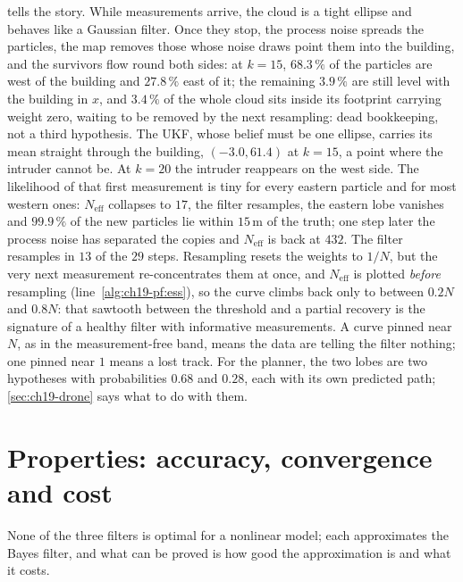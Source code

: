  tells the story.
While measurements arrive, the cloud is a tight ellipse and behaves like a
Gaussian filter. Once they stop, the process noise spreads the particles,
the map removes those whose noise draws point them into the building, and
the survivors flow round both sides: at $k = 15$, $68.3\,\%$ of the
particles are west of the building and $27.8\,\%$ east of it; the remaining
$3.9\,\%$ are still level with the building in $x$, and $3.4\,\%$ of the
whole cloud sits inside its footprint carrying weight zero, waiting to be
removed by the next resampling: dead bookkeeping, not a third hypothesis. The UKF,
whose belief must be one ellipse, carries its mean straight through the
building, $(-3.0, 61.4)$ at $k = 15$, a point where the intruder cannot be.
At $k = 20$ the intruder reappears on the west side. The
likelihood of that first measurement is tiny for every eastern particle and
for most western ones: $N_{\mathrm{eff}}$ collapses to $17$, the filter
resamples, the eastern lobe vanishes and $99.9\,\%$ of the new particles lie
within $15\,\mathrm{m}$ of the truth; one step later the process noise has
separated the copies and $N_{\mathrm{eff}}$ is back at $432$. The filter
resamples in $13$ of the $29$ steps. Resampling resets the weights to
$1/N$, but the very next measurement re-concentrates them at once, and
$N_{\mathrm{eff}}$ is plotted \emph{before} resampling
(line~\ref{alg:ch19-pf:ess}), so the curve climbs back only to between
$0.2N$ and $0.8N$: that sawtooth between the threshold and a partial
recovery is the signature of a healthy filter with informative
measurements. A curve pinned near $N$, as in the measurement-free band,
means the data are telling the filter nothing; one pinned near $1$ means a
lost track. For the planner, the two lobes are two hypotheses with
probabilities $0.68$ and $0.28$, each with its own predicted path;
\cref{sec:ch19-drone} says what to do with them.

\section[Properties and cost]{Properties: accuracy, convergence and cost}
\label{sec:ch19-properties}

None of the three filters is optimal for a nonlinear model; each
approximates the Bayes filter, and what can be proved is how good the
approximation is and what it costs.

